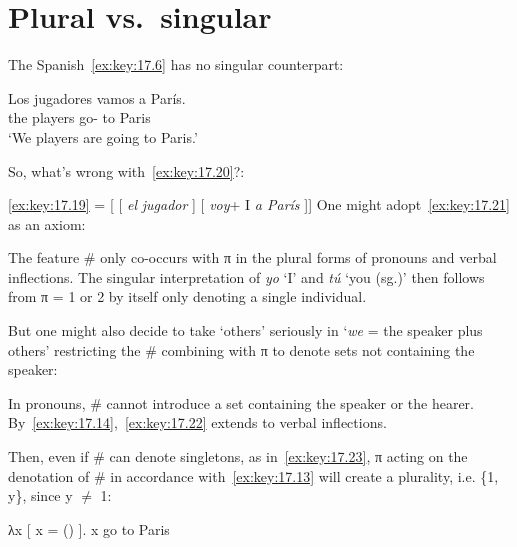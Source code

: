 \documentclass[output=paper]{langsci/langscibook}
\begin{document}
\section{Plural vs.\ singular}\label{sec:key:17.4}

The Spanish~\eqref{ex:key:17.6} has no singular counterpart:

\begin{exe}
\exi{\eqref{ex:key:17.6}}
    \gll    Los jugadores vamos a París.\\
            the players      go-\Fpl{} to Paris\\
    \glt    ‘We players are going to Paris.’
\end{exe}

\label{ex:key:17.19}
\z
So, what’s wrong with~\eqref{ex:key:17.20}?:

\ea\label{ex:key:17.20}
    \eqref{ex:key:17.19} = [ [ \emph{el}\tss{\#} \emph{jugador} ] [ \emph{voy}+ I\tss{\#} \emph{a París} ]]
\z
One might adopt~\eqref{ex:key:17.21} as an axiom:

\ea\label{ex:key:17.21}
    The feature \# only co-occurs with π in the plural forms of pronouns
    and verbal inflections.
\z
The singular interpretation of \emph{yo} ‘I’ and \emph{tú} ‘you (sg.)’ then
follows from π = 1 or 2 by itself only denoting a single individual.

But one might also decide to take ‘others’ seriously in ‘\emph{we} = the
speaker plus others’ restricting the \# combining with π to denote sets not
containing the speaker:

\ea\label{ex:key:17.22}
    In pronouns, \# cannot introduce a set containing the speaker or the hearer.
\z
By~\eqref{ex:key:17.14},~\eqref{ex:key:17.22} extends to verbal inflections.

Then, even if \# can denote singletons, as in~\eqref{ex:key:17.23}, π acting on
the denotation of \# in accordance with~\eqref{ex:key:17.13} will create a
plurality, i.e. \{1, y\}, since y ${\neq}$ 1:

\ea\label{ex:key:17.23}
    λx [ x = () ]. x go to Paris\\
\z
\end{document}
